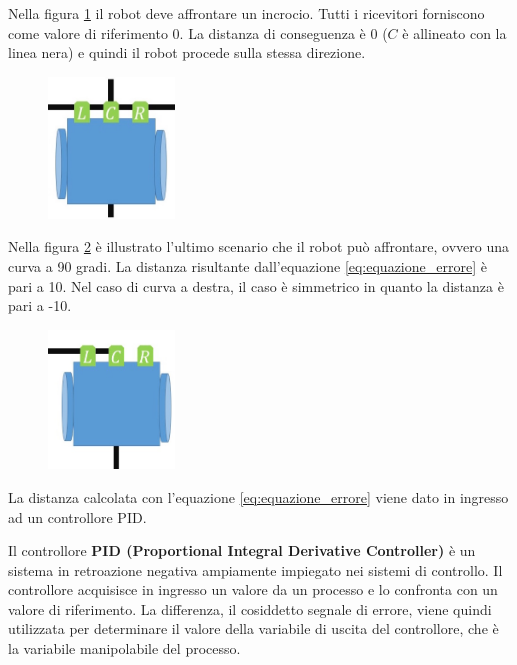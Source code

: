 \documentclass[twoside,twocolumn]{article}
\begin{document}
Nella figura \ref{fig:t2} il robot deve affrontare un incrocio. Tutti i ricevitori forniscono come valore di riferimento 0. La distanza di conseguenza è 0 ($C$ è allineato con la linea nera) e quindi il robot procede sulla stessa direzione.

\begin{figure}[h]
	\centering
	\includegraphics[width=0.3\textwidth]{immagini/t2}
	\caption{}
	\label{fig:t2}
\end{figure}

Nella figura \ref{fig:t3} è illustrato l'ultimo scenario che il robot può affrontare, ovvero una curva a 90 gradi. La distanza risultante dall'equazione \ref{eq:equazione_errore} è pari a 10. Nel caso di curva a destra, il caso è simmetrico in quanto la distanza è pari a -10.

\begin{figure}[h]
	\centering
	\includegraphics[width=0.3\textwidth]{immagini/t3}
	\caption{}
	\label{fig:t3}
\end{figure}


La distanza calcolata con l'equazione \ref{eq:equazione_errore} viene dato in ingresso ad un controllore PID.

Il controllore \textbf{PID (Proportional Integral Derivative Controller)} è un sistema in retroazione negativa ampiamente impiegato nei sistemi di controllo. Il controllore acquisisce in ingresso un valore da un processo e lo confronta con un valore di riferimento. La differenza, il cosiddetto segnale di errore, viene quindi utilizzata per determinare il valore della variabile di uscita del controllore, che è la variabile manipolabile del processo.
\end{document}

